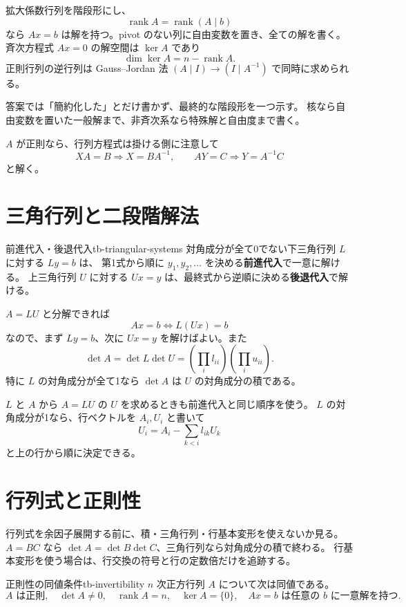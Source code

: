 拡大係数行列を階段形にし、
\[
\operatorname{rank}A=\operatorname{rank}(A\mid b)
\]
なら $Ax=b$ は解を持つ。pivot のない列に自由変数を置き、全ての解を書く。
斉次方程式 $Ax=0$ の解空間は $\ker A$ であり
\[
\dim\ker A=n-\operatorname{rank}A.
\]
正則行列の逆行列は Gauss--Jordan 法
$(A\mid I)\longrightarrow(I\mid A^{-1})$ で同時に求められる。

答案では「簡約化した」とだけ書かず、最終的な階段形を一つ示す。
核なら自由変数を置いた一般解まで、非斉次系なら特殊解と自由度まで書く。

$A$ が正則なら、行列方程式は掛ける側に注意して
\[
XA=B\Longrightarrow X=BA^{-1},\qquad
AY=C\Longrightarrow Y=A^{-1}C
\]
と解く。

\section{三角行列と二段階解法}

\begin{proposition}{前進代入・後退代入}{tb-triangular-systems}
対角成分が全て0でない下三角行列 $L$ に対する $Ly=b$ は、
第1式から順に $y_1,y_2,\ldots$ を決める\textbf{前進代入}で一意に解ける。
上三角行列 $U$ に対する $Ux=y$ は、最終式から逆順に決める\textbf{後退代入}で解ける。
\end{proposition}

$A=LU$ と分解できれば
\[
Ax=b\Longleftrightarrow L(Ux)=b
\]
なので、まず $Ly=b$、次に $Ux=y$ を解けばよい。また
\[
\det A=\det L\det U
=\left(\prod_i l_{ii}\right)\left(\prod_i u_{ii}\right).
\]
特に $L$ の対角成分が全て1なら $\det A$ は $U$ の対角成分の積である。

$L$ と $A$ から $A=LU$ の $U$ を求めるときも前進代入と同じ順序を使う。
$L$ の対角成分が1なら、行ベクトルを $A_i,U_i$ と書いて
\[
U_i=A_i-\sum_{k<i}l_{ik}U_k
\]
と上の行から順に決定できる。

\section{行列式と正則性}

行列式を余因子展開する前に、積・三角行列・行基本変形を使えないか見る。
$A=BC$ なら $\det A=\det B\det C$、三角行列なら対角成分の積で終わる。
行基本変形を使う場合は、行交換の符号と行の定数倍だけを追跡する。

\begin{theorem}{正則性の同値条件}{tb-invertibility}
$n$ 次正方行列 $A$ について次は同値である。
\[
A\text{ は正則},\quad \det A\ne0,\quad \operatorname{rank}A=n,
\quad\ker A=\{0\},\quad Ax=b\text{ は任意の }b\text{ に一意解を持つ}.
\]
\end{theorem}

